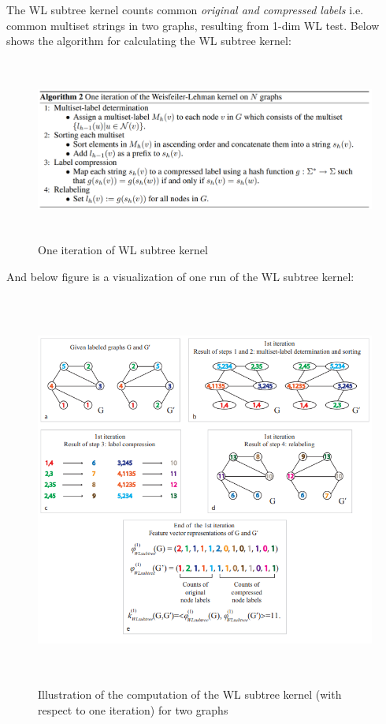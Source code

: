 The WL subtree kernel counts common {\it original and compressed labels} i.e. common multiset strings in two graphs, resulting from 1-dim WL test.
Below shows the algorithm for calculating the WL subtree kernel:

\begin{figure}[hbt]
\centering
	\includegraphics[height=6cm]{preliminaries/fig/wl-kernel-alg.png}
	\caption{One iteration of WL subtree kernel}
\end{figure}

And below figure is a visualization of one run of the WL subtree kernel:

\begin{figure}[hbt!]
\centering
	\includegraphics[height=13cm]{preliminaries/fig/fig1.png}
	\caption{Illustration of the computation of the WL subtree kernel (with respect to one iteration) for two graphs}
\end{figure}

